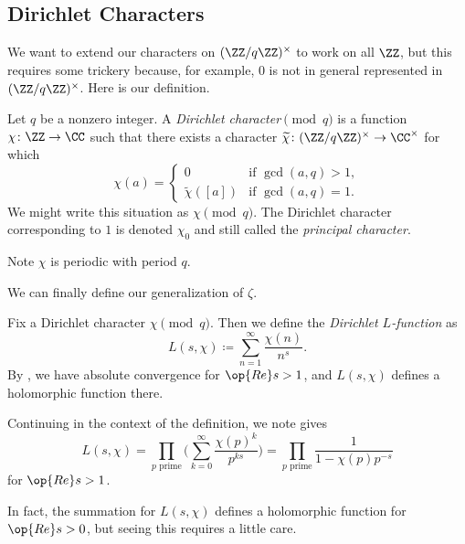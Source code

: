 \documentclass[../notes.tex]{subfiles}
\begin{document}
\subsection{Dirichlet Characters}
We want to extend our characters on $(\ZZ/q\ZZ)^\times$ to work on all $\ZZ$, but this requires some trickery because, for example, $0$ is not in general represented in $(\ZZ/q\ZZ)^\times$. Here is our definition.
\begin{definition}
	Let $q$ be a nonzero integer. A \textit{Dirichlet character$\pmod q$} is a function $\chi\colon\ZZ\to\CC$ such that there exists a character $\widetilde\chi\colon(\ZZ/q\ZZ)^\times\to\CC^\times$ for which
	\[\chi(a)=\begin{cases}
		0 & \text{if }\gcd(a,q)>1, \\
		\widetilde\chi([a]) & \text{if }\gcd(a,q)=1.
	\end{cases}\]
	We might write this situation as $\chi\pmod q$. The Dirichlet character corresponding to $1$ is denoted $\chi_0$ and still called the \textit{principal character}.
\end{definition}
\begin{remark}
	Note $\chi$ is periodic with period $q$.
\end{remark}
We can finally define our generalization of $\zeta$.
\begin{definition}
	Fix a Dirichlet character $\chi\pmod q$. Then we define the \textit{Dirichlet $L$-function} as
	\[L(s,\chi)\coloneqq\sum_{n=1}^\infty\frac{\chi(n)}{n^s}.\]
	By , we have absolute convergence for $\op{Re}s>1$, and $L(s,\chi)$ defines a holomorphic function there.
\end{definition}
\begin{remark} \label{rem:l-euler-prod}
	Continuing in the context of the definition, we note  gives
	\[L(s,\chi)=\prod_{p\text{ prime}}\Bigg(\sum_{k=0}^\infty\frac{\chi(p)^k}{p^{ks}}\Bigg)=\prod_{p\text{ prime}}\frac1{1-\chi(p)p^{-s}}\]
	for $\op{Re}s>1$.
\end{remark}
In fact, the summation for $L(s,\chi)$ defines a holomorphic function for $\op{Re}s>0$, but seeing this requires a little care.
\end{document}
